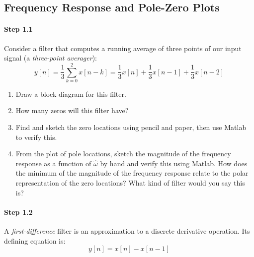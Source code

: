 \subsection{Frequency Response and Pole-Zero Plots}

\paragraph{Step 1.1} Consider a filter that computes a running average
of three points of our input signal (a \emph{three-point averager}):
\begin{equation}
y[n] = \frac{1}{3} \sum_{k=0}^2 x[n-k] 
     = \frac{1}{3}x[n] + \frac{1}{3}x[n-1] + \frac{1}{3}x[n-2]
\end{equation}

\begin{enumerate}\renewcommand{\theenumi}{\alph{enumi}}
\item Draw a block diagram for this filter.


\item How many zeros will this filter have?


\item Find and sketch the zero locations using pencil and paper, then
  use Matlab to verify this.

\item From the plot of pole locations, sketch the magnitude of the
  frequency response as a function of $\hat{\omega}$ by hand and
  verify this using Matlab. How does the minimum of the magnitude of
  the frequency response relate to the polar representation of the
  zero locations?  What kind of filter would you say this is?

\end{enumerate}


\paragraph{Step 1.2} A \emph{first-difference} filter is an
approximation to a discrete derivative operation. Its defining
equation is:
\begin{equation}
  y[n] = x[n] - x[n-1]
\end{equation}

